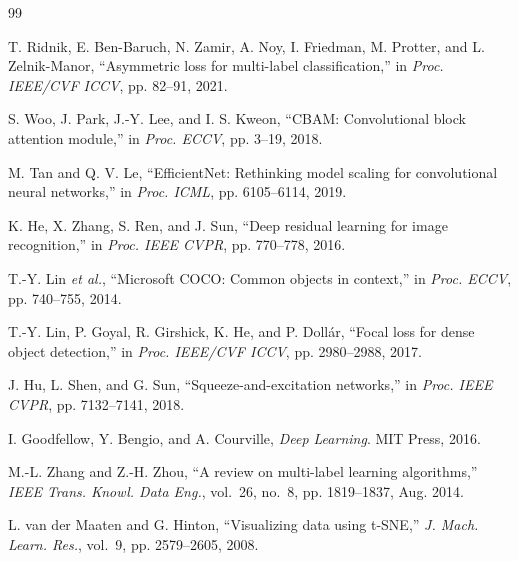 \documentclass[conference]{IEEEtran}
\begin{document}
\begin{thebibliography}{99}

T. Ridnik, E. Ben-Baruch, N. Zamir, A. Noy, I. Friedman, M. Protter,
and L. Zelnik-Manor,
``Asymmetric loss for multi-label classification,''
in \textit{Proc. IEEE/CVF ICCV}, pp. 82--91, 2021.

S. Woo, J. Park, J.-Y. Lee, and I. S. Kweon,
``CBAM: Convolutional block attention module,''
in \textit{Proc. ECCV}, pp. 3--19, 2018.

M. Tan and Q. V. Le,
``EfficientNet: Rethinking model scaling for convolutional neural networks,''
in \textit{Proc. ICML}, pp. 6105--6114, 2019.

K. He, X. Zhang, S. Ren, and J. Sun,
``Deep residual learning for image recognition,''
in \textit{Proc. IEEE CVPR}, pp. 770--778, 2016.

T.-Y. Lin \textit{et al.},
``Microsoft COCO: Common objects in context,''
in \textit{Proc. ECCV}, pp. 740--755, 2014.

T.-Y. Lin, P. Goyal, R. Girshick, K. He, and P. Dollár,
``Focal loss for dense object detection,''
in \textit{Proc. IEEE/CVF ICCV}, pp. 2980--2988, 2017.

J. Hu, L. Shen, and G. Sun,
``Squeeze-and-excitation networks,''
in \textit{Proc. IEEE CVPR}, pp. 7132--7141, 2018.

I. Goodfellow, Y. Bengio, and A. Courville,
\textit{Deep Learning}.
MIT Press, 2016.

M.-L. Zhang and Z.-H. Zhou,
``A review on multi-label learning algorithms,''
\textit{IEEE Trans. Knowl. Data Eng.}, vol.~26, no.~8, pp. 1819--1837, Aug. 2014.

L. van der Maaten and G. Hinton,
``Visualizing data using {t-SNE},''
\textit{J. Mach. Learn. Res.}, vol.~9, pp. 2579--2605, 2008.

\end{thebibliography}
\end{document}
